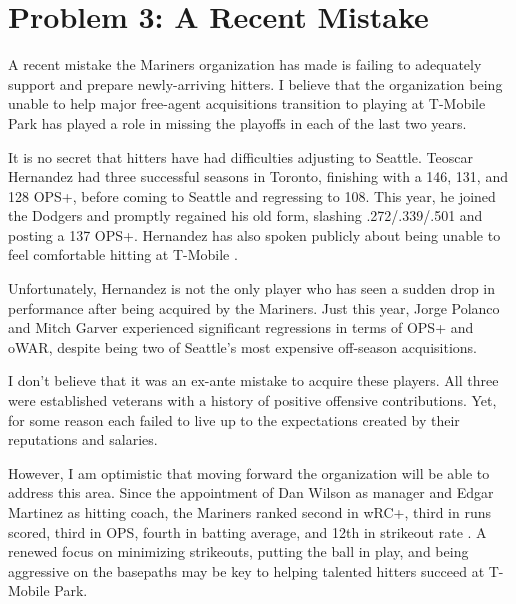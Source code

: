 
\section*{Problem 3: A Recent Mistake}
\label{sec:p3}

A recent mistake the Mariners organization has made is failing to adequately support and prepare newly-arriving hitters. I believe that the organization being unable to help major free-agent acquisitions transition to playing at T-Mobile Park has played a role in missing the playoffs in each of the last two years.

It is no secret that hitters have had difficulties adjusting to Seattle. Teoscar Hernandez had three successful seasons in Toronto, finishing with a 146, 131, and 128 OPS+, before coming to Seattle and regressing to 108. This year, he joined the Dodgers and promptly regained his old form, slashing .272/.339/.501 and posting a 137 OPS+. Hernandez has also spoken publicly about being unable to feel comfortable hitting at T-Mobile \cite{hereth}.

Unfortunately, Hernandez is  not the only player who has seen a sudden drop in performance after being acquired by the Mariners. Just this year, Jorge Polanco and Mitch Garver experienced significant regressions in terms of OPS+ and oWAR, despite being two of Seattle's most expensive off-season acquisitions.

I don't believe that it was an ex-ante mistake to acquire these players. All three were established veterans with a history of positive offensive contributions. Yet, for some reason each failed to live up to the expectations created by their reputations and salaries.

However, I am optimistic that moving forward the organization will be able to address this area. Since the appointment of Dan Wilson as manager and Edgar Martinez as hitting coach, the Mariners ranked second in wRC+, third in runs scored, third in OPS, fourth in batting average, and 12th in strikeout rate \cite{kramer}. A renewed focus on minimizing strikeouts, putting the ball in play, and being aggressive on the basepaths may be key to helping talented hitters succeed at T-Mobile Park.